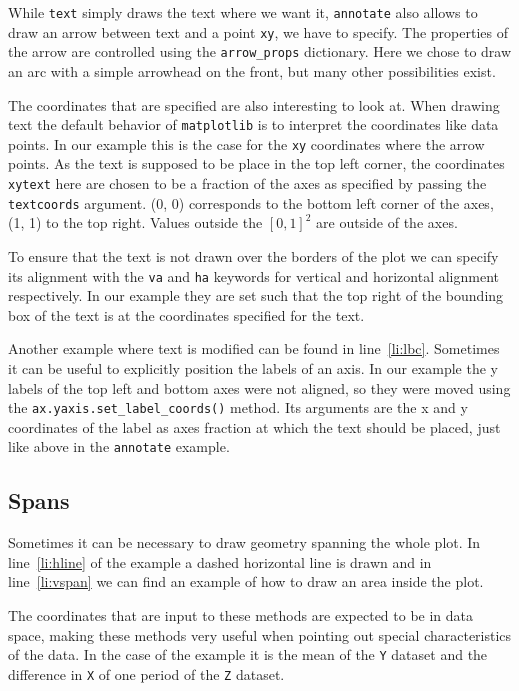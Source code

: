 \documentclass[a4paper, 11pt, onecolumn]{article}
\newcommand{\mpl}{\texttt{matplotlib}\xspace}
\newcommand{\pl}[1]{\mbox{\texttt{#1}\xspace}}
\newcommand{\baseref}[3]{\mbox{#1 \ref{#2:#3}\xspace}}
\newcommand{\lin}[1]{\baseref{line}{li}{#1}}
\begin{document}
While \pl{text} simply draws the text where we want it, \pl{annotate} also
allows to draw an arrow between text and a point \pl{xy}, we have to specify.
The properties of the arrow are controlled using the \pl{arrow\_props}
dictionary. Here we chose to draw an arc with a simple arrowhead on the front,
but many other possibilities exist.

The coordinates that are specified are also interesting to look at. When
drawing text the default behavior of \mpl is to interpret the coordinates like
data points. In our example this is the case for the \pl{xy} coordinates where
the arrow points. As the text is supposed to be place in the top left corner,
the coordinates \pl{xytext} here are chosen to be a fraction of the axes as
specified by passing the \pl{textcoords} argument. (0, 0) corresponds to the
bottom left corner of the axes, (1, 1) to the top right. Values outside the
$[0, 1]^2$ are outside of the axes.

To ensure that the text is not drawn over the borders of the plot we can
specify its alignment with the \pl{va} and \pl{ha} keywords for vertical and
horizontal alignment respectively. In our example they are set such that the 
top right of the bounding box of the text is at the coordinates specified for 
the text.

Another example where text is modified can be found in \lin{lbc}.
Sometimes it can be useful to explicitly position the labels of an axis. In
our example the y labels of the top left and bottom axes were not aligned, so
they were moved using the \pl{ax.yaxis.set\_label\_coords()} method. Its
arguments are the x and y coordinates of the label as axes fraction at which
the text should be placed, just like above in the \pl{annotate} example.


\subsection{Spans}

Sometimes it can be necessary to draw geometry spanning the whole plot.
In \lin{hline} of the example a dashed horizontal line is drawn and in
\lin{vspan} we can find an example of how to draw an area inside the plot.

The coordinates that are input to these methods are expected to be in data
space, making these methods very useful when pointing out special
characteristics of the data. In the case of the example it is the mean of
the \pl{Y} dataset and the difference in \pl{X} of one period of the \pl{Z}
dataset.
\end{document}
